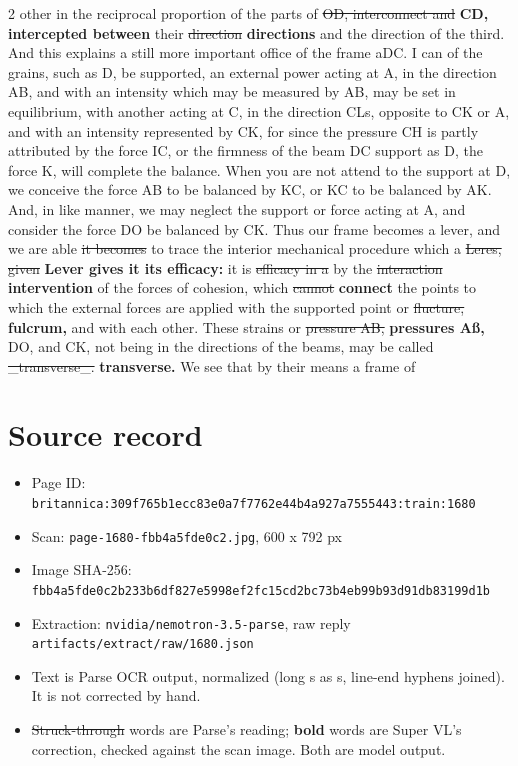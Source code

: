 \documentclass[10pt]{article}
\begin{document}
\begin{multicols}{2}
other in the reciprocal proportion of the parts of \sout{OD, interconnect and} \textbf{CD, intercepted between} their \sout{direction} \textbf{directions} and the direction of the third. And this explains a still more important office of the frame aDC. I can of the grains, such as D, be supported, an external power acting at A, in the direction AB, and with an intensity which may be measured by AB, may be set in equilibrium, with another acting at C, in the direction CLs, opposite to CK or A, and with an intensity represented by CK, for since the pressure CH is partly attributed by the force IC, or the firmness of the beam DC support as D, the force K, will complete the balance. When you are not attend to the support at D, we conceive the force AB to be balanced by KC, or KC to be balanced by AK. And, in like manner, we may neglect the support or force acting at A, and consider the force DO be balanced by CK. Thus our frame becomes a lever, and we are able \sout{it becomes} to trace the interior mechanical procedure which a \sout{Leres, given} \textbf{Lever gives it its efficacy:} it is \sout{efficacy in a} by the \sout{interaction} \textbf{intervention} of the forces of cohesion, which \sout{cannot} \textbf{connect} the points to which the external forces are applied with the supported point or \sout{flucture,} \textbf{fulcrum,} and with each other. These strains or \sout{pressure AB,} \textbf{pressures Aß,} DO, and CK, not being in the directions of the beams, may be called \sout{\_transverse\_.} \textbf{transverse.} We see that by their means a frame of
\end{multicols}
\section*{Source record}
\begin{itemize}
\item Page ID: \texttt{britannica:309f765b1ecc83e0a7f7762e44b4a927a7555443:train:1680}
\item Scan: \texttt{page-1680-fbb4a5fde0c2.jpg}, 600 x 792 px
\item Image SHA-256: \texttt{\small fbb4a5fde0c2b233b6df827e5998ef2fc15cd2bc73b4eb99b93d91db83199d1b}
\item Extraction: \texttt{nvidia/nemotron-3.5-parse}, raw reply \texttt{artifacts/extract/raw/1680.json}
\item Text is Parse OCR output, normalized (long s as s, line-end hyphens joined). It is not corrected by hand.
\item \sout{Struck-through} words are Parse's reading; \textbf{bold} words are Super VL's correction, checked against the scan image. Both are model output.
\end{itemize}
\end{document}
